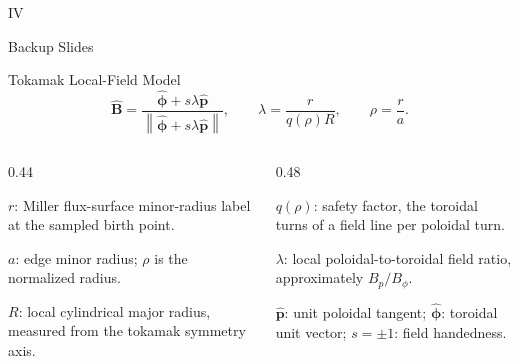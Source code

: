 \documentclass[aspectratio=169,10pt]{beamer}
\newcommand{\Bhat}{\widehat{\mathbf{B}}}
\begin{document}
\appendix

{
\begin{frame}
  \vfill
  {\fontsize{12}{14}\selectfont IV\par}
  \vspace{0.38cm}
  {\fontsize{22}{27}\selectfont Backup Slides\par}
  \vfill
\end{frame}}

\begin{frame}{Tokamak Local-Field Model}
  \centering
  \[
    \Bhat=
    \frac{\widehat{\boldsymbol\phi}+s\lambda\widehat{\mathbf p}}
    {\left\lVert\widehat{\boldsymbol\phi}+s\lambda\widehat{\mathbf p}\right\rVert},
    \qquad
    \lambda=\frac{r}{q(\rho)R},
    \qquad
    \rho=\frac{r}{a}.
  \]

  \vspace{0.10cm}
  \begin{columns}[T,onlytextwidth]
    \begin{column}{0.44\textwidth}
      {\fontsize{8.8}{10.6}\selectfont
      $r$: Miller flux-surface minor-radius label at the sampled birth point.

      \vspace{0.10cm}
      $a$: edge minor radius; $\rho$ is the normalized radius.

      \vspace{0.18cm}
      $R$: local cylindrical major radius, measured from the tokamak symmetry axis.
      }
    \end{column}
    \begin{column}{0.48\textwidth}
      {\fontsize{8.8}{10.6}\selectfont
      $q(\rho)$: safety factor, the toroidal turns of a field line per poloidal turn.

      \vspace{0.18cm}
      $\lambda$: local poloidal-to-toroidal field ratio, approximately $B_p/B_\phi$.

      \vspace{0.18cm}
      $\widehat{\mathbf p}$: unit poloidal tangent; $\widehat{\boldsymbol\phi}$: toroidal unit vector; $s=\pm1$: field handedness.
      }
    \end{column}
  \end{columns}


\end{frame}
\end{document}
